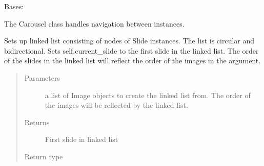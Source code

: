 \documentclass[letterpaper,10pt,english]{sphinxmanual}
\begin{document}
\begin{fulllineitems}
\label{\detokenize{polo.widgets:polo.widgets.slideshow_viewer.Carousel}}
Bases: 

The Carousel class handles navigation between  instances.

\begin{fulllineitems}
\label{\detokenize{polo.widgets:polo.widgets.slideshow_viewer.Carousel.add_slides}}
Sets up linked list consisting of nodes of Slide instances. The list
is circular and bi\sphinxhyphen{}directional. Sets self.current\_slide to the first
slide in the linked list. The order of the slides in the linked list
will reflect the order of the images in the  argument.
\begin{quote}\begin{description}
\item[{Parameters}] \leavevmode
{} \textendash{} a list of Image objects to create the linked list            from. The order of the images will be reflected by the linked list.

\item[{Returns}] \leavevmode
First slide in linked list

\item[{Return type}] \leavevmode
{\hyperref[\detokenize{polo.widgets:polo.widgets.slideshow_viewer.Slide}]{}}

\end{description}\end{quote}

\end{fulllineitems}



\end{fulllineitems}
\end{document}
